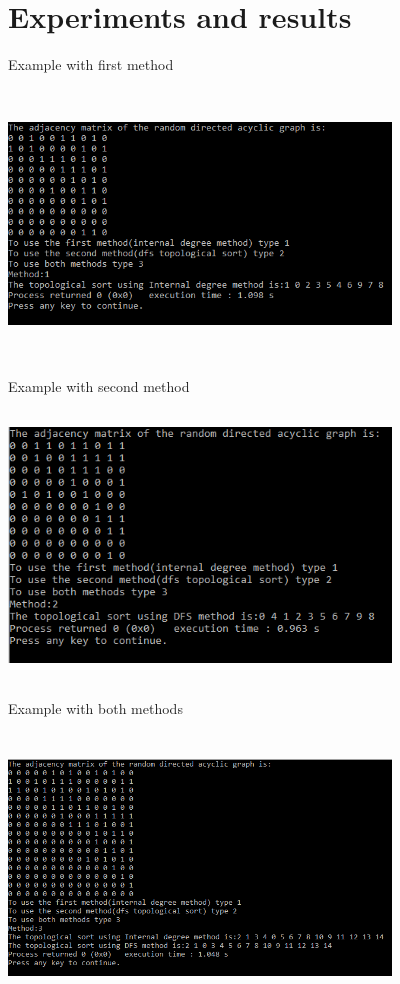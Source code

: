 \documentclass[14pt]{article}
\begin{document}
\section*{Experiments and results}
Example with first method   \\
\includegraphics[height=3.1in, width = 4in]{exemplu1.png}\\
Example with second method  \\
\includegraphics[height=3.1in, width = 4in]{exemplu2.png}\\
Example with both methods  \\
\includegraphics[height=3.1in, width = 4in]{exemplu3.png}
\end{document}
